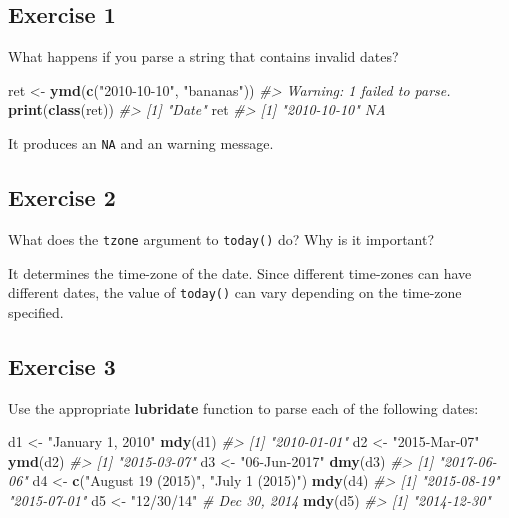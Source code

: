 \documentclass[]{book}
\newenvironment{Shaded}{\begin{snugshade}}{\end{snugshade}}
\newcommand{\CommentTok}[1]{\textcolor[rgb]{0.56,0.35,0.01}{\textit{#1}}}
\newcommand{\KeywordTok}[1]{\textcolor[rgb]{0.13,0.29,0.53}{\textbf{#1}}}
\newcommand{\NormalTok}[1]{#1}
\newcommand{\StringTok}[1]{\textcolor[rgb]{0.31,0.60,0.02}{#1}}
\theoremstyle{plain}
\theoremstyle{remark}
\theoremstyle{definition}
\theoremstyle{definition}
\theoremstyle{definition}
\theoremstyle{remark}
\begin{document}
\hypertarget{exercise-1-46}{%
\subsection{Exercise 1}\label{exercise-1-46}}

What happens if you parse a string that contains invalid dates?

\begin{Shaded}
\begin{Highlighting}[]
\NormalTok{ret <-}\StringTok{ }\KeywordTok{ymd}\NormalTok{(}\KeywordTok{c}\NormalTok{(}\StringTok{"2010-10-10"}\NormalTok{, }\StringTok{"bananas"}\NormalTok{))}
\CommentTok{#> Warning: 1 failed to parse.}
\KeywordTok{print}\NormalTok{(}\KeywordTok{class}\NormalTok{(ret))}
\CommentTok{#> [1] "Date"}
\NormalTok{ret}
\CommentTok{#> [1] "2010-10-10" NA}
\end{Highlighting}
\end{Shaded}

It produces an \texttt{NA} and an warning message.

\hypertarget{exercise-2-44}{%
\subsection{Exercise 2}\label{exercise-2-44}}

What does the \texttt{tzone} argument to \texttt{today()} do? Why is it
important?

It determines the time-zone of the date. Since different time-zones can
have different dates, the value of \texttt{today()} can vary depending
on the time-zone specified.

\hypertarget{exercise-3-34}{%
\subsection{Exercise 3}\label{exercise-3-34}}

Use the appropriate \textbf{lubridate} function to parse each of the
following dates:

\begin{Shaded}
\begin{Highlighting}[]
\NormalTok{d1 <-}\StringTok{ "January 1, 2010"}
\KeywordTok{mdy}\NormalTok{(d1)}
\CommentTok{#> [1] "2010-01-01"}
\NormalTok{d2 <-}\StringTok{ "2015-Mar-07"}
\KeywordTok{ymd}\NormalTok{(d2)}
\CommentTok{#> [1] "2015-03-07"}
\NormalTok{d3 <-}\StringTok{ "06-Jun-2017"}
\KeywordTok{dmy}\NormalTok{(d3)}
\CommentTok{#> [1] "2017-06-06"}
\NormalTok{d4 <-}\StringTok{ }\KeywordTok{c}\NormalTok{(}\StringTok{"August 19 (2015)"}\NormalTok{, }\StringTok{"July 1 (2015)"}\NormalTok{)}
\KeywordTok{mdy}\NormalTok{(d4)}
\CommentTok{#> [1] "2015-08-19" "2015-07-01"}
\NormalTok{d5 <-}\StringTok{ "12/30/14"} \CommentTok{# Dec 30, 2014}
\KeywordTok{mdy}\NormalTok{(d5)}
\CommentTok{#> [1] "2014-12-30"}
\end{Highlighting}
\end{Shaded}
\end{document}
